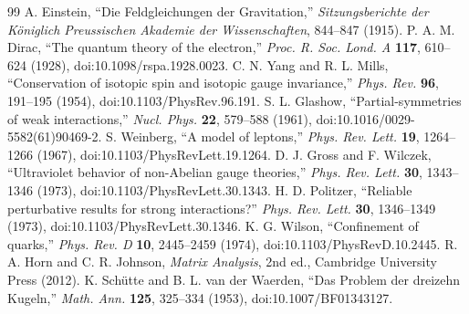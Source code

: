 \documentclass[11pt]{article}
\numberwithin{equation}{section}
\theoremstyle{remark}
\begin{document}
\begin{thebibliography}{99}
 A. Einstein, ``Die Feldgleichungen der Gravitation,'' \emph{Sitzungsberichte der K\"oniglich Preussischen Akademie der Wissenschaften}, 844--847 (1915).
 P. A. M. Dirac, ``The quantum theory of the electron,'' \emph{Proc. R. Soc. Lond. A} \textbf{117}, 610--624 (1928), doi:10.1098/rspa.1928.0023.
 C. N. Yang and R. L. Mills, ``Conservation of isotopic spin and isotopic gauge invariance,'' \emph{Phys. Rev.} \textbf{96}, 191--195 (1954), doi:10.1103/PhysRev.96.191.
 S. L. Glashow, ``Partial-symmetries of weak interactions,'' \emph{Nucl. Phys.} \textbf{22}, 579--588 (1961), doi:10.1016/0029-5582(61)90469-2.
 S. Weinberg, ``A model of leptons,'' \emph{Phys. Rev. Lett.} \textbf{19}, 1264--1266 (1967), doi:10.1103/PhysRevLett.19.1264.
 D. J. Gross and F. Wilczek, ``Ultraviolet behavior of non-Abelian gauge theories,'' \emph{Phys. Rev. Lett.} \textbf{30}, 1343--1346 (1973), doi:10.1103/PhysRevLett.30.1343.
 H. D. Politzer, ``Reliable perturbative results for strong interactions?'' \emph{Phys. Rev. Lett.} \textbf{30}, 1346--1349 (1973), doi:10.1103/PhysRevLett.30.1346.
 K. G. Wilson, ``Confinement of quarks,'' \emph{Phys. Rev. D} \textbf{10}, 2445--2459 (1974), doi:10.1103/PhysRevD.10.2445.
 R. A. Horn and C. R. Johnson, \emph{Matrix Analysis}, 2nd ed., Cambridge University Press (2012).
 K. Sch\"utte and B. L. van der Waerden, ``Das Problem der dreizehn Kugeln,'' \emph{Math. Ann.} \textbf{125}, 325--334 (1953), doi:10.1007/BF01343127.
\end{thebibliography}




\clearpage
{}
{}
\setcounter{page}{1}
\setcounter{section}{0}
\setcounter{subsection}{0}
\setcounter{subsubsection}{0}
\setcounter{equation}{0}
\setcounter{definition}{0}
\renewcommand{\thesection}{\arabic{section}}
\renewcommand{\theHsection}{supp.\arabic{section}}
\renewcommand{\theHequation}{supp.\arabic{section}.\arabic{equation}}
\renewcommand{\theHdefinition}{supp.\arabic{section}.\arabic{definition}}
\end{document}
